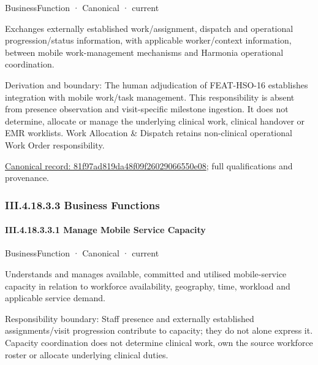 \label{element:81f97ad819da48f09f26029066550e08}
{\small BusinessFunction · Canonical · current}\par

Exchanges externally established work/assignment, dispatch and operational progression/status information, with applicable worker/context information, between mobile work-management mechanisms and Harmonia operational coordination.



Derivation and boundary: The human adjudication of FEAT-HSO-16 establishes integration with mobile work/task management. This responsibility is absent from presence observation and visit-specific milestone ingestion. It does not determine, allocate or manage the underlying clinical work, clinical handover or EMR worklists. Work Allocation \& Dispatch retains non-clinical operational Work Order responsibility.


{\footnotesize \href{../../../../../../../../continuum/business/business-function/81f97ad819da48f09f26029066550e08.md}{Canonical record: 81f97ad819da48f09f26029066550e08}; full qualifications and provenance.}\par
\subsubsection*{III.4.18.3.3 Business Functions}
\label{navigation:III.4.18.3.3}

\paragraph*{III.4.18.3.3.1 Manage Mobile Service Capacity}
\label{navigation:III.4.18.3.3.1}

\label{element:ad5cb5451ef645acb55ceb0c942ea013}
{\small BusinessFunction · Canonical · current}\par

Understands and manages available, committed and utilised mobile-service capacity in relation to workforce availability, geography, time, workload and applicable service demand.



Responsibility boundary: Staff presence and externally established assignments/visit progression contribute to capacity; they do not alone express it. Capacity coordination does not determine clinical work, own the source workforce roster or allocate underlying clinical duties.


